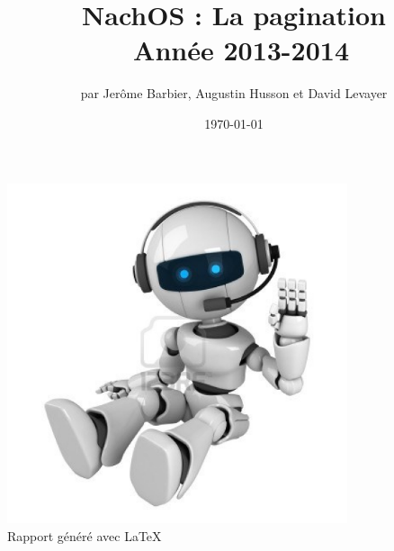 \documentclass[a4paper,10pt]{article}
\title{NachOS : La pagination \\ Année 2013-2014}
\author{par Jerôme Barbier, Augustin Husson et David Levayer}
\date{\today}
\begin{document}
   \maketitle

  \begin{center}
    \includegraphics[width=10cm,height=10cm]{../partie3/robottrading.jpg}\\
    Rapport généré avec \LaTeX
  \end{center}
  \tableofcontents
  \newpage
  
\end{document}
